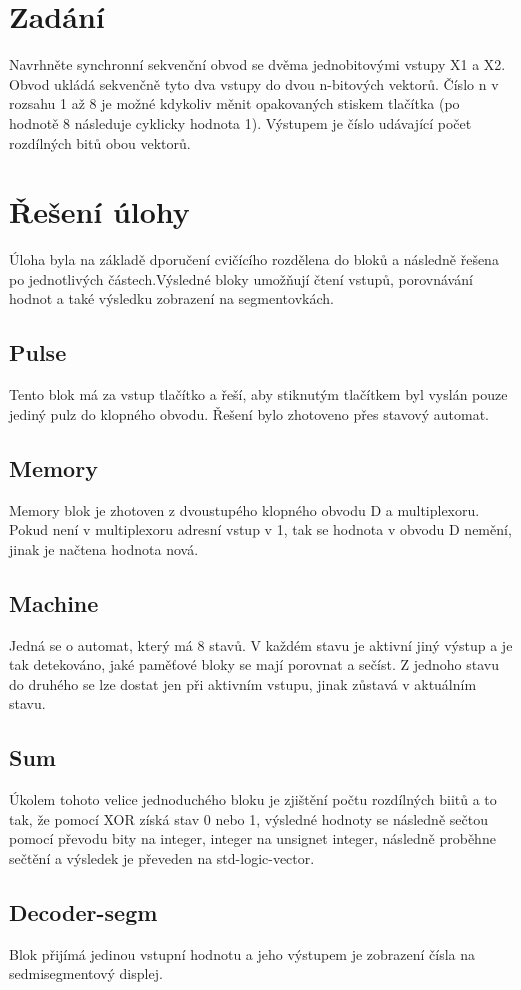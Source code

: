 \documentclass[FM,ZP]{tulthesis}
\begin{document}
\renewcommand{\baselinestretch}{1.50}
\setlength\parindent{1.2cm}
\selectfont
	
\begingroup
\renewcommand{\cleardoublepage}{}
\renewcommand{\clearpage}{}
\chapter{Zadání}
\endgroup
Navrhněte synchronní sekvenční obvod se dvěma jednobitovými vstupy X1 a X2. Obvod ukládá sekvenčně tyto dva vstupy do dvou n-bitových vektorů. Číslo n v rozsahu 1 až 8 je možné kdykoliv měnit opakovaných stiskem tlačítka (po hodnotě 8 následuje cyklicky hodnota 1). Výstupem je číslo udávající počet rozdílných bitů obou vektorů.
	
\begingroup
\renewcommand{\cleardoublepage}{}
\renewcommand{\clearpage}{}
\newpage
\chapter{Řešení úlohy}
\endgroup
Úloha byla na základě dporučení cvičícího rozdělena do bloků a následně řešena po jednotlivých částech.Výsledné bloky umožňují čtení vstupů, porovnávání hodnot a také výsledku zobrazení na segmentovkách.

\section{Pulse}
Tento blok má za vstup tlačítko a řeší, aby stiknutým tlačítkem byl vyslán pouze jediný pulz do klopného obvodu. Řešení bylo zhotoveno přes stavový automat.

\section{Memory}
Memory blok je zhotoven z dvoustupého klopného obvodu D a multiplexoru. Pokud není v multiplexoru adresní vstup v 1, tak se hodnota v obvodu D nemění, jinak je načtena hodnota nová.

\section{Machine}
Jedná se o automat, který má 8 stavů. V každém stavu je aktivní jiný výstup a je tak detekováno, jaké paměťové bloky se mají porovnat a sečíst. Z jednoho stavu do druhého se lze dostat jen při aktivním vstupu, jinak zůstavá v aktuálním stavu.

\section{Sum}
Úkolem tohoto velice jednoduchého bloku je zjištění počtu rozdílných biitů a to tak, že pomocí XOR získá stav 0 nebo 1, výsledné hodnoty se následně sečtou pomocí převodu bity na integer, integer na unsignet integer, následně proběhne sečtění a výsledek je převeden na std-logic-vector.
	
\section{Decoder-segm}
Blok přijímá jedinou vstupní hodnotu a jeho výstupem je zobrazení čísla na sedmisegmentový displej.
\end{document}
